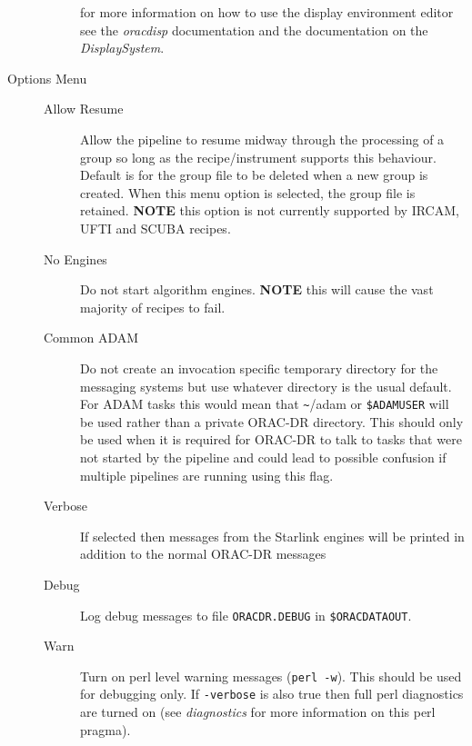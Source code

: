 \documentclass[twoside,11pt]{article}
\renewcommand{\_}{\texttt{\symbol{95}}}
\begin{document}
\begin{description}
\begin{description}
for more information on how to use the display environment editor see
the \emph{oracdisp} documentation and the documentation on the
\emph{DisplaySystem}.

\end{description}

\item[Options Menu] \mbox{}\begin{description}

\item[Allow Resume] \mbox{}

Allow the pipeline to resume midway through the processing of a group
so long as the recipe/instrument supports this behaviour. Default is
for the group file to be deleted when a new group is created. When
this menu option is selected, the group file is retained. \textbf{NOTE} this
option is not currently supported by IRCAM, UFTI and SCUBA recipes.


\item[No Engines] \mbox{}

Do not start algorithm engines. \textbf{NOTE} this will cause the vast
majority of recipes to fail.


\item[Common ADAM] \mbox{}

Do not create an invocation specific temporary directory for the
messaging systems but use whatever directory is the usual default. For
ADAM tasks this would mean that \texttt{\~{}}/adam or \texttt{\$ADAM\_USER} will be used
rather than a private ORAC-DR directory. This should only be used when
it is required for ORAC-DR to talk to tasks that were not started by
the pipeline and could lead to possible confusion if multiple
pipelines are running using this flag.


\item[Verbose] \mbox{}

If selected then messages from the Starlink engines will be printed in
addition to the normal ORAC-DR messages


\item[Debug] \mbox{}

Log debug messages to file \texttt{ORACDR.DEBUG} in \texttt{\$ORAC\_DATA\_OUT}.


\item[Warn] \mbox{}

Turn on perl level warning messages (\texttt{perl -w}). This should be used
for debugging only. If \texttt{-verbose} is also true then full perl
diagnostics are turned on (see \emph{diagnostics} for more information on
this perl pragma).



\end{description}
\end{description}
\end{document}
